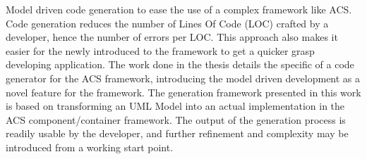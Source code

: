 %
Model driven code generation to ease the use of a complex framework like ACS.
Code generation reduces the number of Lines Of Code (LOC) crafted by a developer,
hence the number of errors per LOC.
This approach also makes it easier for the newly introduced
to the framework to get a quicker grasp developing application.
The work done in the thesis details the specific of a code generator for the ACS framework,
introducing the
model driven development as a novel feature for the framework.
The generation framework presented in this work
is based on transforming an UML Model
into an actual implementation in the
ACS component/container framework.
The output of the generation process
is readily usable by the developer,
and further refinement and complexity may be introduced
from a working start point.


